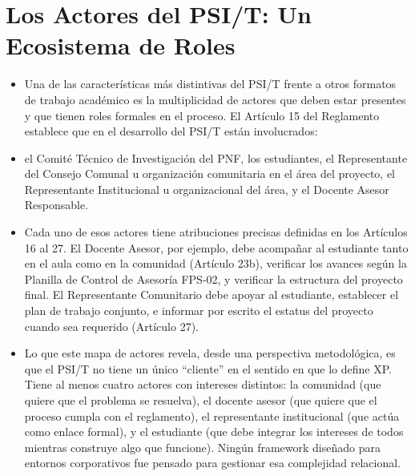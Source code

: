 \documentclass[14pt,a4paper,oneside]{extbook}
\begin{document}
\section{Los Actores del PSI/T: Un Ecosistema de Roles}
\begin{itemize}
\item Una de las características más distintivas del PSI/T frente a otros formatos de trabajo académico es la multiplicidad de actores que deben estar presentes y que tienen roles formales en el proceso. El Artículo 15 del Reglamento establece que en el desarrollo del PSI/T están involucrados:
\item el Comité Técnico de Investigación del PNF, los estudiantes, el Representante del Consejo Comunal u organización comunitaria en el área del proyecto, el Representante Institucional u organizacional del área, y el Docente Asesor Responsable.
\item Cada uno de esos actores tiene atribuciones precisas definidas en los Artículos 16 al 27. El Docente Asesor, por ejemplo, debe acompañar al estudiante tanto en el aula como en la comunidad (Artículo 23b), verificar los avances según la Planilla de Control de Asesoría FPS-02, y verificar la estructura del proyecto final. El Representante Comunitario debe apoyar al estudiante, establecer el plan de trabajo conjunto, e informar por escrito el estatus del proyecto cuando sea requerido (Artículo 27).
\item Lo que este mapa de actores revela, desde una perspectiva metodológica, es que el PSI/T no tiene un único \enquote{cliente} en el sentido en que lo define XP. Tiene al menos cuatro actores con intereses distintos: la comunidad (que quiere que el problema se resuelva), el docente asesor (que quiere que el proceso cumpla con el reglamento), el representante institucional (que actúa como enlace formal), y el estudiante (que debe integrar los intereses de todos mientras construye algo que funcione). Ningún framework diseñado para entornos corporativos fue pensado para gestionar esa complejidad relacional.
\end{itemize}
\end{document}
